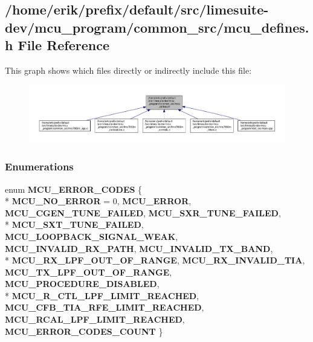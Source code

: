 \subsection{/home/erik/prefix/default/src/limesuite-\/dev/mcu\+\_\+program/common\+\_\+src/mcu\+\_\+defines.h File Reference}
\label{mcu__defines_8h}
This graph shows which files directly or indirectly include this file\+:
\nopagebreak
\begin{figure}[H]
\begin{center}
\leavevmode
\includegraphics[width=350pt]{d7/d84/mcu__defines_8h__dep__incl}
\end{center}
\end{figure}
\subsubsection*{Enumerations}
\begin{DoxyCompactItemize}
\item 
enum {\bf M\+C\+U\+\_\+\+E\+R\+R\+O\+R\+\_\+\+C\+O\+D\+ES} \{ \\*
{\bf M\+C\+U\+\_\+\+N\+O\+\_\+\+E\+R\+R\+OR} = 0, 
{\bf M\+C\+U\+\_\+\+E\+R\+R\+OR}, 
{\bf M\+C\+U\+\_\+\+C\+G\+E\+N\+\_\+\+T\+U\+N\+E\+\_\+\+F\+A\+I\+L\+ED}, 
{\bf M\+C\+U\+\_\+\+S\+X\+R\+\_\+\+T\+U\+N\+E\+\_\+\+F\+A\+I\+L\+ED}, 
\\*
{\bf M\+C\+U\+\_\+\+S\+X\+T\+\_\+\+T\+U\+N\+E\+\_\+\+F\+A\+I\+L\+ED}, 
{\bf M\+C\+U\+\_\+\+L\+O\+O\+P\+B\+A\+C\+K\+\_\+\+S\+I\+G\+N\+A\+L\+\_\+\+W\+E\+AK}, 
{\bf M\+C\+U\+\_\+\+I\+N\+V\+A\+L\+I\+D\+\_\+\+R\+X\+\_\+\+P\+A\+TH}, 
{\bf M\+C\+U\+\_\+\+I\+N\+V\+A\+L\+I\+D\+\_\+\+T\+X\+\_\+\+B\+A\+ND}, 
\\*
{\bf M\+C\+U\+\_\+\+R\+X\+\_\+\+L\+P\+F\+\_\+\+O\+U\+T\+\_\+\+O\+F\+\_\+\+R\+A\+N\+GE}, 
{\bf M\+C\+U\+\_\+\+R\+X\+\_\+\+I\+N\+V\+A\+L\+I\+D\+\_\+\+T\+IA}, 
{\bf M\+C\+U\+\_\+\+T\+X\+\_\+\+L\+P\+F\+\_\+\+O\+U\+T\+\_\+\+O\+F\+\_\+\+R\+A\+N\+GE}, 
{\bf M\+C\+U\+\_\+\+P\+R\+O\+C\+E\+D\+U\+R\+E\+\_\+\+D\+I\+S\+A\+B\+L\+ED}, 
\\*
{\bf M\+C\+U\+\_\+\+R\+\_\+\+C\+T\+L\+\_\+\+L\+P\+F\+\_\+\+L\+I\+M\+I\+T\+\_\+\+R\+E\+A\+C\+H\+ED}, 
{\bf M\+C\+U\+\_\+\+C\+F\+B\+\_\+\+T\+I\+A\+\_\+\+R\+F\+E\+\_\+\+L\+I\+M\+I\+T\+\_\+\+R\+E\+A\+C\+H\+ED}, 
{\bf M\+C\+U\+\_\+\+R\+C\+A\+L\+\_\+\+L\+P\+F\+\_\+\+L\+I\+M\+I\+T\+\_\+\+R\+E\+A\+C\+H\+ED}, 
{\bf M\+C\+U\+\_\+\+E\+R\+R\+O\+R\+\_\+\+C\+O\+D\+E\+S\+\_\+\+C\+O\+U\+NT}
 \}
\end{DoxyCompactItemize}


